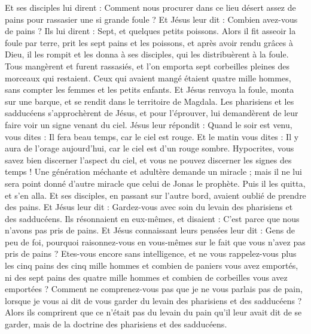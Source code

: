 \begin{multicols}{2}
Et ses disciples lui dirent : Comment nous procurer dans ce lieu désert assez de pains pour rassasier une si grande foule ?
Et Jésus leur dit : Combien avez-vous de pains ? Ils lui dirent : Sept, et quelques petits poissons.
Alors il fit asseoir la foule par terre,
prit les sept pains et les poissons, et après avoir rendu grâces à Dieu, il les rompit et les donna à ses disciples, qui les distribuèrent à la foule.
Tous mangèrent et furent rassasiés, et l’on emporta sept corbeilles pleines des morceaux qui restaient.
Ceux qui avaient mangé étaient quatre mille hommes, sans compter les femmes et les petits enfants.
Et Jésus renvoya la foule, monta sur une barque, et se rendit dans le territoire de Magdala.
\VerseOne{}Les pharisiens et les sadducéens s’approchèrent de Jésus, et pour l'éprouver, lui demandèrent de leur faire voir un signe venant du ciel.
Jésus leur répondit : Quand le soir est venu, vous dites : Il fera beau temps, car le ciel est rouge.
Et le matin vous dites : Il y aura de l'orage aujourd'hui, car le ciel est d’un rouge sombre. Hypocrites, vous savez bien discerner l’aspect du ciel, et vous ne pouvez discerner les signes des temps !
Une génération méchante et adultère demande un miracle ; mais il ne lui sera point donné d'autre miracle que celui de Jonas le prophète. Puis il les quitta, et s'en alla.
Et ses disciples, en passant sur l’autre bord, avaient oublié de prendre des pains.
Et Jésus leur dit : Gardez-vous avec soin du levain des pharisiens et des sadducéens.
Ils résonnaient en eux-mêmes, et disaient : C’est parce que nous n'avons pas pris de pains.
Et Jésus connaissant leurs pensées leur dit : Gens de peu de foi, pourquoi raisonnez-vous en vous-mêmes sur le fait que vous n'avez pas pris de pains ?
Etes-vous encore sans intelligence, et ne vous rappelez-vous plus les cinq pains des cinq mille hommes et combien de paniers vous avez emportés,
ni des sept pains des quatre mille hommes et combien de corbeilles vous avez emportées ?
Comment ne comprenez-vous pas que je ne vous parlais pas de pain, lorsque je vous ai dit de vous garder du levain des pharisiens et des sadducéens ?
Alors ils comprirent que ce n'était pas du levain du pain qu'il leur avait dit de se garder, mais de la doctrine des pharisiens et des sadducéens.

\end{multicols}
